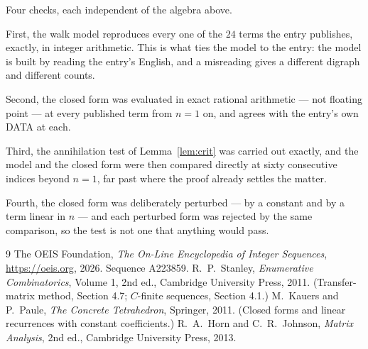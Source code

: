 \documentclass[11pt,a4paper]{article}
\theoremstyle{plain}
\theoremstyle{definition}
\begin{document}
Four checks, each independent of the algebra above.

First, the walk model reproduces every one of the $24$ terms the entry publishes,
exactly, in integer arithmetic. This is what ties the model to the entry: the model is built
by reading the entry's English, and a misreading gives a different digraph and different
counts.

Second, the closed form was evaluated in exact rational arithmetic --- not floating point ---
at every published term from $n=1$ on, and agrees with the entry's own DATA at each.

Third, the annihilation test of Lemma~\ref{lem:crit} was carried out exactly, and the model
and the closed form were then compared directly at sixty consecutive indices beyond
$n=1$, far past where the proof already settles the matter.

Fourth, the closed form was deliberately perturbed --- by a constant and by a term linear in
$n$ --- and each perturbed form was rejected by the same comparison, so the test is not one
that anything would pass.

\begin{thebibliography}{9}
 The OEIS Foundation, \emph{The On-Line Encyclopedia of Integer
Sequences}, \url{https://oeis.org}, 2026. Sequence A223859.
 R.~P.~Stanley, \emph{Enumerative Combinatorics}, Volume 1, 2nd ed.,
Cambridge University Press, 2011. (Transfer-matrix method, Section 4.7; $C$-finite sequences,
Section 4.1.)
 M.~Kauers and P.~Paule, \emph{The Concrete Tetrahedron}, Springer, 2011.
(Closed forms and linear recurrences with constant coefficients.)
 R.~A.~Horn and C.~R.~Johnson, \emph{Matrix Analysis}, 2nd ed., Cambridge
University Press, 2013.
\end{thebibliography}
\end{document}
